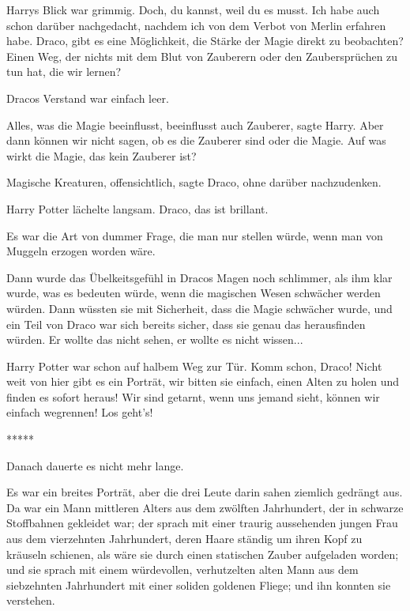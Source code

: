 Harrys Blick war grimmig. \glqq{}Doch, du kannst, weil du es musst. Ich habe auch
schon darüber nachgedacht, nachdem ich von dem Verbot von Merlin erfahren habe.
Draco, gibt es eine Möglichkeit, die Stärke der Magie direkt zu beobachten?
Einen Weg, der nichts mit dem Blut von Zauberern oder den Zaubersprüchen zu tun
hat, die wir lernen?\grqq{}

Dracos Verstand war einfach leer.

\glqq{}Alles, was die Magie beeinflusst, beeinflusst auch Zauberer\grqq{}, sagte
Harry. \glqq{}Aber dann können wir nicht sagen, ob es die Zauberer sind oder die
Magie. Auf was wirkt die Magie, das kein Zauberer ist?\grqq{}

\glqq{}Magische Kreaturen, offensichtlich\grqq{}, sagte Draco, ohne darüber
nachzudenken.

Harry Potter lächelte langsam. \glqq{}Draco, das ist brillant.\grqq{}

Es war die Art von dummer Frage, die man nur stellen würde, wenn man von Muggeln
erzogen worden wäre.

Dann wurde das Übelkeitsgefühl in Dracos Magen noch schlimmer, als ihm klar
wurde, was es bedeuten würde, wenn die magischen Wesen schwächer werden würden.
Dann wüssten sie mit Sicherheit, dass die Magie schwächer wurde, und ein Teil
von Draco war sich bereits sicher, dass sie genau das herausfinden würden. Er
wollte das nicht sehen, er wollte es nicht wissen...

Harry Potter war schon auf halbem Weg zur Tür. \glqq{}Komm schon, Draco! Nicht
weit von hier gibt es ein Porträt, wir bitten sie einfach, einen Alten zu holen
und finden es sofort heraus! Wir sind getarnt, wenn uns jemand sieht, können wir
einfach wegrennen! Los geht's!\grqq{}

\begin{center}*****\end{center}

Danach dauerte es nicht mehr lange.

Es war ein breites Porträt, aber die drei Leute darin sahen ziemlich gedrängt
aus. Da war ein Mann mittleren Alters aus dem zwölften Jahrhundert, der in
schwarze Stoffbahnen gekleidet war; der sprach mit einer traurig aussehenden
jungen Frau aus dem vierzehnten Jahrhundert, deren Haare ständig um ihren Kopf
zu kräuseln schienen, als wäre sie durch einen statischen Zauber aufgeladen
worden; und sie sprach mit einem würdevollen, verhutzelten alten Mann aus dem
siebzehnten Jahrhundert mit einer soliden goldenen Fliege; und ihn konnten sie
verstehen.

